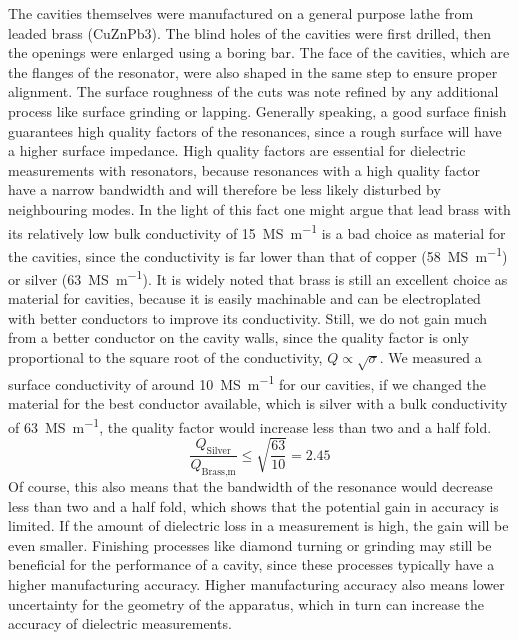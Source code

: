 The cavities themselves were manufactured on a general purpose lathe from leaded brass (CuZnPb3). The blind holes of the cavities were first drilled, then the openings were enlarged using a boring bar. The face of the cavities, which are the flanges of the resonator, were also shaped in the same step to ensure proper alignment. The surface roughness of the cuts was note refined by any additional process like surface grinding or lapping. Generally speaking, a good surface finish guarantees high quality factors of the resonances, since a rough surface will have a higher surface impedance. High quality factors are essential for dielectric measurements with resonators, because resonances with a high quality factor have a narrow bandwidth and will therefore be less likely disturbed by neighbouring modes. In the light of this fact one might argue that lead brass with its relatively low bulk conductivity of \SI{15}{\mega\siemens\per\meter} is a bad choice as material for the cavities, since the conductivity is far lower than that of copper (\SI{58}{\mega\siemens\per\meter}) or silver (\SI{63}{\mega\siemens\per\meter}). It is widely noted that brass is still an excellent choice as material for cavities, because it is easily machinable and can be electroplated with better conductors to improve its conductivity. Still, we do not gain much from a better conductor on the cavity walls, since the quality factor is only proportional to the square root of the conductivity, $Q\propto\sqrt{\sigma}$. We measured a surface conductivity of around \SI{10}{\mega\siemens\per\meter} for our cavities, if we changed the material for the best conductor available, which is silver with a bulk conductivity of \SI{63}{\mega\siemens\per\meter}, the quality factor would increase less than two and a half fold.
\begin{equation*}
\frac{Q_\text{Silver}}{Q_\text{Brass,m}}\leq\sqrt{\frac{63}{10}}=2.45
\end{equation*}
Of course, this also means that the bandwidth of the resonance would decrease less than two and a half fold, which shows that the potential gain in accuracy is limited. If the amount of dielectric loss in a measurement is high, the gain will be even smaller. Finishing processes like diamond turning or grinding may still be beneficial for the performance of a cavity, since these processes typically have a higher manufacturing accuracy. Higher manufacturing accuracy also means lower uncertainty for the geometry of the apparatus, which in turn can increase the accuracy of dielectric measurements.

